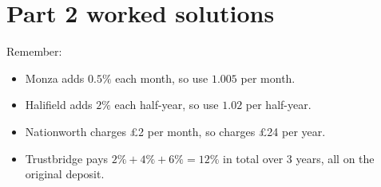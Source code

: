 \documentclass[12pt]{article}
\begin{document}
\section*{Part 2 worked solutions}

Remember:
\begin{itemize}[leftmargin=5mm, itemsep=1mm]
  \item Monza adds $0.5\%$ each month, so use $1.005$ per month.
  \item Halifield adds $2\%$ each half-year, so use $1.02$ per half-year.
  \item Nationworth charges \pounds2 per month, so charges \pounds24 per year.
  \item Trustbridge pays $2\%+4\%+6\%=12\%$ in total over 3 years, all on the original deposit.
\end{itemize}
\end{document}
